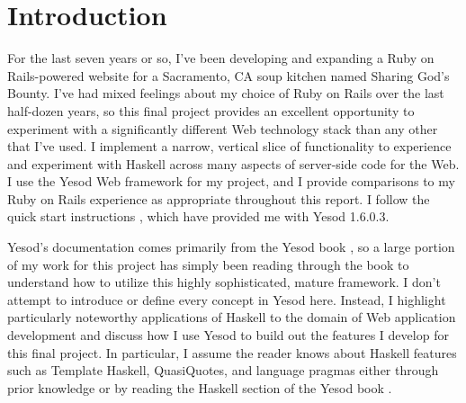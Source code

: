 \section{Introduction}

For the last seven years or so, I've been developing and expanding a Ruby on Rails-powered website for a Sacramento, CA soup kitchen named Sharing God's Bounty. I've had mixed feelings about my choice of Ruby on Rails over the last half-dozen years, so this final project provides an excellent opportunity to experiment with a significantly different Web technology stack than any other that I've used. I implement a narrow, vertical slice of functionality to experience and experiment with Haskell across many aspects of server-side code for the Web. I use the Yesod Web framework for my project, and I provide comparisons to my Ruby on Rails experience as appropriate throughout this report. I follow the quick start instructions \cite{yesodQuickstart}, which have provided me with Yesod 1.6.0.3.

Yesod's documentation comes primarily from the Yesod book \cite{ybk}, so a large portion of my work for this project has simply been reading through the book to understand how to utilize this highly sophisticated, mature framework. I don't attempt to introduce or define every concept in Yesod here. Instead, I highlight particularly noteworthy applications of Haskell to the domain of Web application development and discuss how I use Yesod to build out the features I develop for this final project. In particular, I assume the reader knows about Haskell features such as Template Haskell, QuasiQuotes, and language pragmas either through prior knowledge or by reading the Haskell section of the Yesod book \cite{ybkHaskell}.

